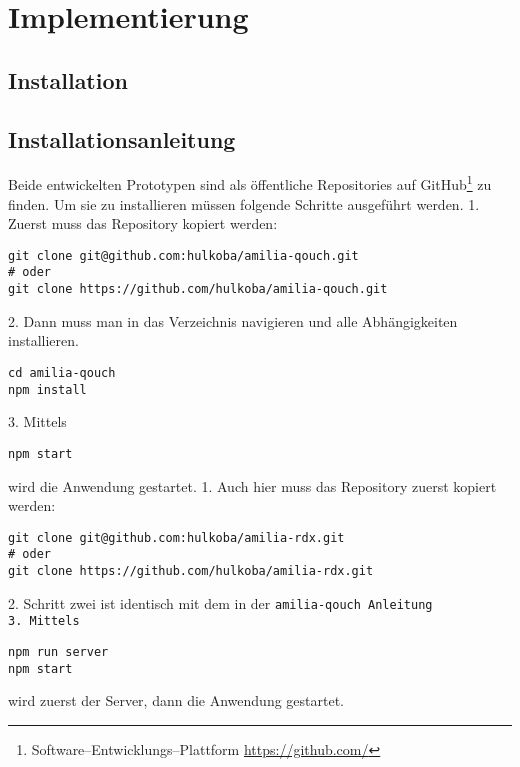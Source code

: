 \chapter{\label{chap:implementierung}Implementierung}
\section{Installation}
%
%
\section{Installationsanleitung}
Beide entwickelten Prototypen sind als öffentliche Repositories auf GitHub\footnote{Software--Entwicklungs--Plattform \url{https://github.com/}} zu finden. 
Um sie zu installieren müssen folgende Schritte ausgeführt werden.
1. Zuerst muss das Repository kopiert werden:
\begin{lstlisting}
git clone git@github.com:hulkoba/amilia-qouch.git
# oder
git clone https://github.com/hulkoba/amilia-qouch.git
\end{lstlisting}
2. Dann muss man in das Verzeichnis navigieren und alle Abhängigkeiten installieren.
\begin{lstlisting}
cd amilia-qouch
npm install
\end{lstlisting}
3. Mittels
\begin{lstlisting}
npm start
\end{lstlisting}
wird die Anwendung gestartet.
%
1. Auch hier muss das Repository zuerst kopiert werden:
\begin{lstlisting}
git clone git@github.com:hulkoba/amilia-rdx.git
# oder
git clone https://github.com/hulkoba/amilia-rdx.git
\end{lstlisting}
2. Schritt zwei ist identisch mit dem in der \tt{amilia-qouch} Anleitung\\
3. Mittels
\begin{lstlisting}
npm run server
npm start
\end{lstlisting}
wird zuerst der Server, dann die Anwendung gestartet.
